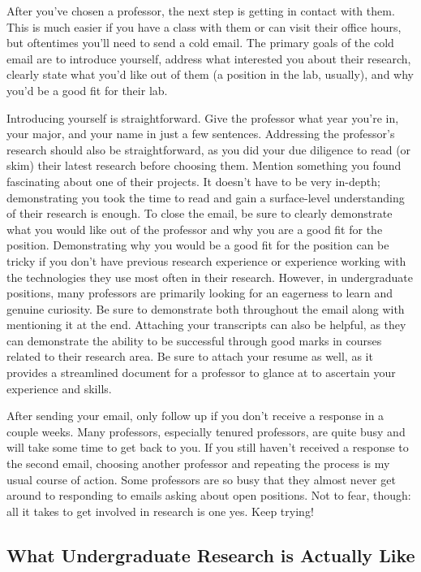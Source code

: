 \documentclass[12pt]{article}
\begin{document}
After you’ve chosen a professor, the next step is getting in contact with them. This is much easier if you have a class with them or can visit their office hours, but oftentimes you’ll need to send a cold email. The primary goals of the cold email are to introduce yourself, address what interested you about their research, clearly state what you’d like out of them (a position in the lab, usually), and why you’d be a good fit for their lab. \cite{berkeleycoldemail}

Introducing yourself is straightforward. Give the professor what year you’re in, your major, and your name in just a few sentences. Addressing the professor’s research should also be straightforward, as you did your due diligence to read (or skim) their latest research before choosing them. Mention something you found fascinating about one of their projects. It doesn’t have to be very in-depth; demonstrating you took the time to read and gain a surface-level understanding of their research is enough. To close the email, be sure to clearly demonstrate what you would like out of the professor and why you are a good fit for the position. Demonstrating why you would be a good fit for the position can be tricky if you don’t have previous research experience or experience working with the technologies they use most often in their research. However, in undergraduate positions, many professors are primarily looking for an eagerness to learn and genuine curiosity. \cite{berkeleycoldemail} Be sure to demonstrate both throughout the email along with mentioning it at the end. Attaching your transcripts can also be helpful, as they can demonstrate the ability to be successful through good marks in courses related to their research area. Be sure to attach your resume as well, as it provides a streamlined document for a professor to glance at to ascertain your experience and skills. \cite{berkeleycoldemail}

After sending your email, only follow up if you don't receive a response in a couple weeks. Many professors, especially tenured professors, are quite busy and will take some time to get back to you. If you still haven't received a response to the second email, choosing another professor and repeating the process is my usual course of action. Some professors are so busy that they almost never get around to responding to emails asking about open positions. Not to fear, though: all it takes to get involved in research is one yes. Keep trying!

\subsection{What Undergraduate Research is Actually Like}
\end{document}
